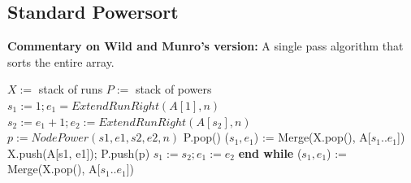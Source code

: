 \documentclass{article}
\begin{document}
\subsection{\textbf{Standard Powersort}}
\textbf{Commentary on Wild and Munro's version:} 
A single pass algorithm that sorts the entire array. 
\begin{algorithm}
\caption{Powersort(A[1...n]) by Wild and Munro:}
\begin{algorithmic}[1]
\State $X :=$ stack of runs 
\State $P :=$ stack of powers 
\State $s_1 := 1; e_1 = ExtendRunRight(A[1], n)$
    \State $s_2 := e_1 + 1; e_2 := ExtendRunRight(A[s_2], n)$ 
    \State $p := NodePower(s1, e1, s2, e2, n)$ 
     
        \State P.pop() 
        \State ($s_1, e_1$) := Merge(X.pop(), A[$s_1..e_1$])
    \EndWhile \State X.push(A[s1, e1]); P.push(p)
    \State $s_1 := s_2; e_1 := e_2$
\EndWhile 
\State \textbf{end while} 
    \State ($s_1, e_1$) := Merge(X.pop(), A[$s_1..e_1$])
\EndWhile 
\end{algorithmic}
\end{algorithm}
\newpage
\end{document}

